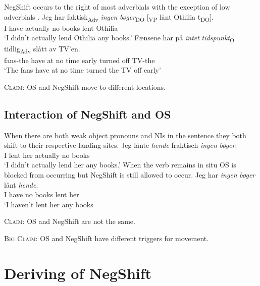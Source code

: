 \documentclass[12pt, letterpaper]{article}
\newcommand{\sub}[1]{\textsubscript{#1}}
\begin{document}
\ex NegShift occurs to the right of most adverbials with the exception of low adverbials \citep{nilsenAdverbsAshift1997,svenoniusStrainsNegationNorwegian2002}.
	\ea 
	\gll Jeg har faktisk\sub{Adv} \emph{ingen} \emph{bøger}\sub{DO} [\sub{VP} lånt Othilia t\sub{DO}].\\
	I have actually no books {} lent Othilia \\
	\glt `I didn't actually lend Othilia any books.'
	\ex 
	\gll Fænsene har på \emph{intet} \emph{tidspunkt}\sub{O} tidlig\sub{Adv} slått av TV’en.\\
	fans-the have at no time early turned off TV-the\\
	\glt `The fans have at no time turned the TV off early'
	\z 


\z

\begin{tcolorbox}[width=\linewidth]
\textsc{Claim}: OS and NegShift move to different locations.
\end{tcolorbox}

\subsection{Interaction of NegShift and OS} \label{sec:NEG-OS}
\ea When there are both weak object pronouns and NIs in the sentence they both shift to their respective landing sites. 
	\ea
	\label{ex:NegOS}
	\gll Jeg lånte \textit{hende} fraktisch \textit{ingen} \textit{bøger}.\\
	I lent her actually no books\\
	\glt `I didn't actually lend her any books.'
	\z 
\ex When the verb remains in situ OS is blocked from occurring but NegShift is still allowed to occur. 
	\ea 
	\gll Jeg har \emph{ingen} \emph{bøger} lånt \emph{hende}.\\
	I have no books lent her\\
	\glt `I haven't lent her any books
	\z
\z

\begin{tcolorbox}[width=\linewidth]
\textsc{Claim:} OS and NegShift are not the same.

\textsc{Big Claim:} OS and NegShift have different triggers for movement. 
\end{tcolorbox}


\section{Deriving of NegShift} \label{sec:ZEIJLSTRA}
\end{document}
